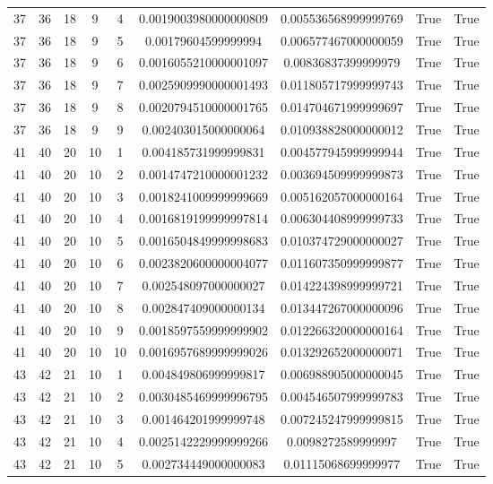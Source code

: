 \documentclass[a4paper,11pt]{article}
\begin{document}
\begin{landscape}
\begin{longtable}{ccccccccc}
37 & 36 & 18 & 9 & 4 & 0.0019003980000000809 & 0.005536568999999769 & True & True \\
37 & 36 & 18 & 9 & 5 & 0.00179604599999994 & 0.006577467000000059 & True & True \\
37 & 36 & 18 & 9 & 6 & 0.0016055210000001097 & 0.00836837399999979 & True & True \\
37 & 36 & 18 & 9 & 7 & 0.0025909990000001493 & 0.011805717999999743 & True & True \\
37 & 36 & 18 & 9 & 8 & 0.0020794510000001765 & 0.014704671999999697 & True & True \\
37 & 36 & 18 & 9 & 9 & 0.002403015000000064 & 0.010938828000000012 & True & True \\
41 & 40 & 20 & 10 & 1 & 0.004185731999999831 & 0.004577945999999944 & True & True \\
41 & 40 & 20 & 10 & 2 & 0.0014747210000001232 & 0.003694509999999873 & True & True \\
41 & 40 & 20 & 10 & 3 & 0.0018241009999999669 & 0.005162057000000164 & True & True \\
41 & 40 & 20 & 10 & 4 & 0.0016819199999997814 & 0.006304408999999733 & True & True \\
41 & 40 & 20 & 10 & 5 & 0.0016504849999998683 & 0.010374729000000027 & True & True \\
41 & 40 & 20 & 10 & 6 & 0.0023820600000004077 & 0.011607350999999877 & True & True \\
41 & 40 & 20 & 10 & 7 & 0.002548097000000027 & 0.014224398999999721 & True & True \\
41 & 40 & 20 & 10 & 8 & 0.002847409000000134 & 0.013447267000000096 & True & True \\
41 & 40 & 20 & 10 & 9 & 0.0018597559999999902 & 0.012266320000000164 & True & True \\
41 & 40 & 20 & 10 & 10 & 0.0016957689999999026 & 0.013292652000000071 & True & True \\
43 & 42 & 21 & 10 & 1 & 0.004849806999999817 & 0.006988905000000045 & True & True \\
43 & 42 & 21 & 10 & 2 & 0.0030485469999996795 & 0.004546507999999783 & True & True \\
43 & 42 & 21 & 10 & 3 & 0.001464201999999748 & 0.007245247999999815 & True & True \\
43 & 42 & 21 & 10 & 4 & 0.0025142229999999266 & 0.0098272589999997 & True & True \\
43 & 42 & 21 & 10 & 5 & 0.002734449000000083 & 0.01115068699999977 & True & True \\

\end{longtable}
\end{landscape}
\end{document}
